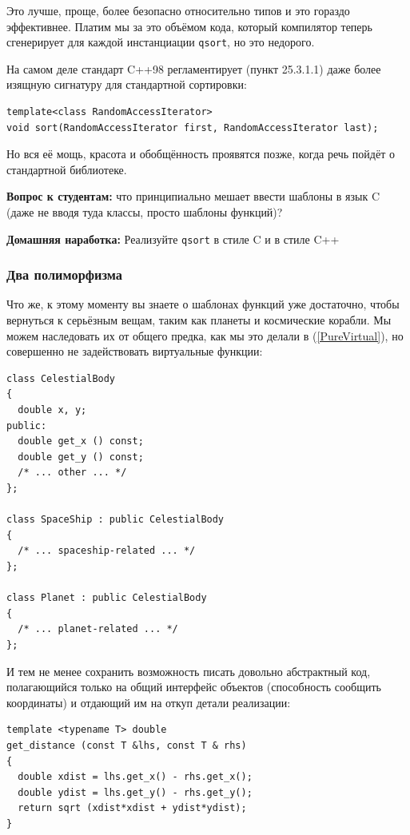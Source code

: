 \documentclass[a4paper,12pt,oneside]{article}
\newif\ifanswers
\begin{document}
Это лучше, проще, более безопасно относительно типов и это гораздо эффективнее. Платим мы за это объёмом кода, который компилятор теперь сгенерирует для каждой инстанциации \lstinline!qsort!, но это недорого.

На самом деле стандарт C++98 регламентирует (пункт 25.3.1.1) даже более изящную сигнатуру для стандартной сортировки:

\begin{lstlisting}
template<class RandomAccessIterator>
void sort(RandomAccessIterator first, RandomAccessIterator last);
\end{lstlisting}

Но вся её мощь, красота и обобщённость проявятся позже, когда речь пойдёт о стандартной библиотеке.

\textbf{Вопрос к студентам:} что принципиально мешает ввести шаблоны в язык C (даже не вводя туда классы, просто шаблоны функций)?

\ifanswers
В этом случае не обойтись без манглирования имён, чего в случае C никто не хочет
\fi

\textbf{Домашняя наработка:} Реализуйте \lstinline!qsort! в стиле C и в стиле C++

\subsubsection{Два полиморфизма}\label{TemplatePolymorphism}

Что же, к этому моменту вы знаете о шаблонах функций уже достаточно, чтобы вернуться к серьёзным вещам, таким как планеты и космические корабли. Мы можем наследовать их от общего предка, как мы это делали в (\ref{PureVirtual}), но совершенно не задействовать виртуальные функции:

\begin{lstlisting}
class CelestialBody
{
  double x, y;
public:
  double get_x () const;
  double get_y () const;
  /* ... other ... */ 
};

class SpaceShip : public CelestialBody
{
  /* ... spaceship-related ... */
};

class Planet : public CelestialBody
{
  /* ... planet-related ... */
};
\end{lstlisting}

И тем не менее сохранить возможность писать довольно абстрактный код, полагающийся только на общий интерфейс объектов (способность сообщить координаты) и отдающий им на откуп детали реализации:

\begin{lstlisting}
template <typename T> double
get_distance (const T &lhs, const T & rhs)
{
  double xdist = lhs.get_x() - rhs.get_x();
  double ydist = lhs.get_y() - rhs.get_y();
  return sqrt (xdist*xdist + ydist*ydist);
}
\end{lstlisting}
\end{document}
